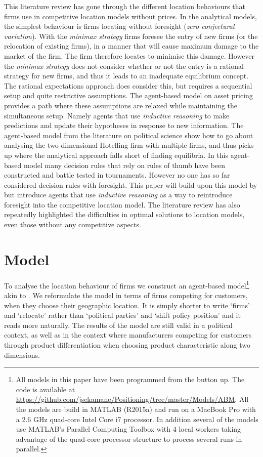 \documentclass[preprint, 12pt]{elsarticle}
\begin{document}
This literature review has gone through the different location behaviours that firms use in competitive location models without prices. In the analytical models, the simplest behaviour is firms locating without foresight (\emph{zero conjectural variation}). With the \emph{minimax strategy} firms foresee the entry of new firms (or the relocation of existing firms), in a manner that will cause maximum damage to the market of the firm. The firm therefore locates to minimise this damage. However the \emph{minimax strategy} does not consider whether or not the entry is a rational strategy for new firms, and thus it leads to an inadequate equilibrium concept. The rational expectations approach does consider this, but requires a sequential setup and quite restrictive assumptions. The agent-based model on asset pricing provides a path where these assumptions are relaxed while maintaining the simultaneous setup. Namely agents that use \emph{inductive reasoning} to make predictions and update their hypotheses in response to new information. The agent-based model from the literature on political science show how to go about analysing the two-dimensional Hotelling firm with multiple firms, and thus picks up where the analytical approach falls short of finding equilibria. In this agent-based model many decision rules that rely on rules of thumb have been constructed and battle tested in tournaments. However no one has so far considered decision rules with foresight. This paper will build upon this model by \citet{Laver_Sergenti_2011} but introduce agents that use \emph{inductive reasoning} as a way to reintroduce foresight into the competitive location model. The literature review has also repeatedly highlighted the difficulties in optimal solutions to location models, even those without any competitive aspects.


\section{Model}

To analyse the location behaviour of firms we construct an agent-based model\footnote{All models in this paper have been programmed from the button up. The code is available at \url{https://github.com/jsekamane/Positioning/tree/master/Models/ABM}. All the models are build in MATLAB (R2015a) and run on a MacBook Pro with a 2.6 GHz quad-core Intel Core i7 processor. In addition several of the models use MATLAB's Parallel Computing Toolbox with 4 local workers taking advantage of the quad-core processor structure to process several runs in parallel.} akin to \citet{Laver_Sergenti_2011}. We reformulate the model in terms of firms competing for customers, when they choose their geographic location. It is simply shorter to write `firms' and `relocate' rather than `political parties' and `shift policy position' and it reads more naturally. The results of the model are still valid in a political context, as well as in the context where manufacturers competing for customers through product differentiation when choosing product characteristic along two dimensions. 
\end{document}
